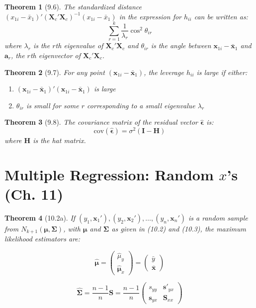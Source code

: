 \documentclass{article}
\newtheorem{theorem}{Theorem}[section]
\begin{document}
\begin{theorem}[9.6]
The standardized distance $(x_{1i} - \bar{x}_1)'(\mathbf{X}_c'\mathbf{X}_c)^{-1}(x_{1i} - \bar{x}_1)$ in the expression for $h_{ii}$ can be written as:
\[\sum_{r=1}^k \frac{1}{\lambda_r}\cos^2\theta_{ir}\]
where $\lambda_r$ is the $r$th eigenvalue of $\mathbf{X}_c'\mathbf{X}_c$ and $\theta_{ir}$ is the angle between $\mathbf{x}_{1i} - \bar{\mathbf{x}}_1$ and $\mathbf{a}_r$, the $r$th eigenvector of $\mathbf{X}_c'\mathbf{X}_c$.
\end{theorem}

\begin{theorem}[9.7]
For any point $(\mathbf{x}_{1i} - \bar{\mathbf{x}}_1)$, the leverage $h_{ii}$ is large if either:
\begin{enumerate}[label=(\roman*)]
\item $(\mathbf{x}_{1i} - \bar{\mathbf{x}}_1)'(\mathbf{x}_{1i} - \bar{\mathbf{x}}_1)$ is large
\item $\theta_{ir}$ is small for some $r$ corresponding to a small eigenvalue $\lambda_r$
\end{enumerate}
\end{theorem}

\begin{theorem}[9.8]
The covariance matrix of the residual vector $\hat{\boldsymbol{\epsilon}}$ is:
\[\text{cov}(\hat{\boldsymbol{\epsilon}}) = \sigma^2(\mathbf{I} - \mathbf{H})\]
where $\mathbf{H}$ is the hat matrix.
\end{theorem}

\section{Multiple Regression: Random $x$’s (Ch. 11)}
\begin{theorem}[10.2a]
If $(y_1, \mathbf{x}_1'), (y_2, \mathbf{x}_2'), \ldots, (y_n, \mathbf{x}_n')$ is a random sample from $N_{k+1}(\boldsymbol{\mu}, \boldsymbol{\Sigma})$, with $\boldsymbol{\mu}$ and $\boldsymbol{\Sigma}$ as given in (10.2) and (10.3), the maximum likelihood estimators are:

\[\hat{\boldsymbol{\mu}} = \begin{pmatrix} \hat{\mu}_y \\ \hat{\boldsymbol{\mu}}_x \end{pmatrix} = \begin{pmatrix} \bar{y} \\ \bar{\mathbf{x}} \end{pmatrix}\]

\[\hat{\boldsymbol{\Sigma}} = \frac{n-1}{n}\mathbf{S} = \frac{n-1}{n}\begin{pmatrix} s_{yy} & \mathbf{s}'_{yx} \\ \mathbf{s}_{yx} & \mathbf{S}_{xx} \end{pmatrix}\]
\end{theorem}
\end{document}
